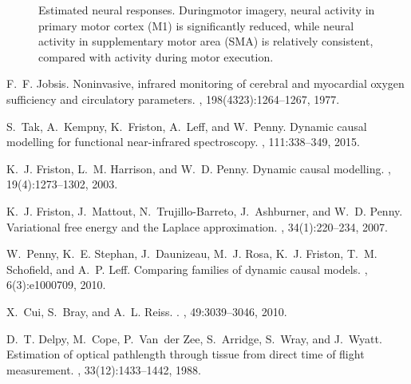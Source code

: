 \newpage
\begin{figure}
\begin{center}
\caption{Estimated neural responses. Duringmotor imagery, neural activity in primary motor cortex (M1) is significantly reduced, while neural activity in supplementary motor area (SMA) is relatively consistent, compared with activity during motor execution.\label{fig:est_neural}}
\end{center}
\end{figure}


\clearpage

\begin{thebibliography}{10}

F.~F. Jobsis.
\newblock Noninvasive, infrared monitoring of cerebral and myocardial oxygen
  sufficiency and circulatory parameters.
, 198(4323):1264--1267, 1977.

S.~Tak, A.~Kempny, K.~Friston, A.~Leff, and W.~Penny.
\newblock Dynamic causal modelling for functional near-infrared spectroscopy.
, 111:338--349, 2015.

K.~J. Friston, L.~M. Harrison, and W.~D. Penny.
\newblock Dynamic causal modelling.
, 19(4):1273--1302, 2003.

K.~J. Friston, J.~Mattout, N.~Trujillo-Barreto, J.~Ashburner, and W.~D. Penny.
\newblock Variational free energy and the {Laplace} approximation.
, 34(1):220--234, 2007.

W.~Penny, K.~E. Stephan, J.~Daunizeau, M.~J. Rosa, K.~J. Friston, T.~M.
  Schofield, and A.~P. Leff.
\newblock Comparing families of dynamic causal models.
, 6(3):e1000709, 2010.

X.~Cui, S.~Bray, and A.~L. Reiss.
.
, 49:3039--3046, 2010.

D.~T. Delpy, M.~Cope, P.~Van~der Zee, S.~Arridge, S.~Wray, and J.~Wyatt.
\newblock Estimation of optical pathlength through tissue from direct time of
  flight measurement.
, 33(12):1433--1442, 1988.


\end{thebibliography}
